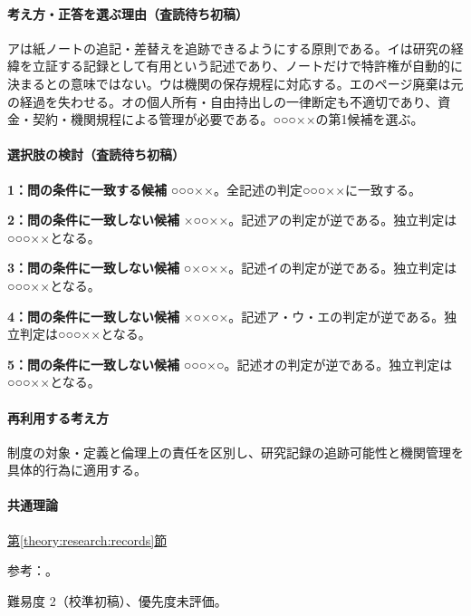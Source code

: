 \paragraph{考え方・正答を選ぶ理由（査読待ち初稿）} アは紙ノートの追記・差替えを追跡できるようにする原則である。イは研究の経緯を立証する記録として有用という記述であり、ノートだけで特許権が自動的に決まるとの意味ではない。ウは機関の保存規程に対応する。エのページ廃棄は元の経過を失わせる。オの個人所有・自由持出しの一律断定も不適切であり、資金・契約・機関規程による管理が必要である。○○○××の第1候補を選ぶ。

\paragraph{選択肢の検討（査読待ち初稿）}\mbox{}\par

\noindent\textbf{1：問の条件に一致する候補} ○○○××。全記述の判定○○○××に一致する。\par

\noindent\textbf{2：問の条件に一致しない候補} ×○○××。記述アの判定が逆である。独立判定は○○○××となる。\par

\noindent\textbf{3：問の条件に一致しない候補} ○×○××。記述イの判定が逆である。独立判定は○○○××となる。\par

\noindent\textbf{4：問の条件に一致しない候補} ×○×○×。記述ア・ウ・エの判定が逆である。独立判定は○○○××となる。\par

\noindent\textbf{5：問の条件に一致しない候補} ○○○×○。記述オの判定が逆である。独立判定は○○○××となる。\par

\paragraph{再利用する考え方} 制度の対象・定義と倫理上の責任を区別し、研究記録の追跡可能性と機関管理を具体的行為に適用する。

\paragraph{共通理論} \hyperref[theory:research:records]{第\ref*{theory:research:records}節}

\par 参考：\cite{mext_misconduct2014,jsps_integrity2025}。

\par 難易度 2（校準初稿）、優先度未評価。

